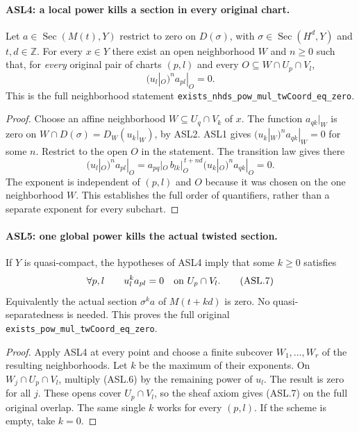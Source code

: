\paragraph{ASL4: a local power kills a section in every original chart.}
\label{claim:ASL4}
Let $a\in\operatorname{Sec}(M(t),Y)$ restrict to zero on
$D(\sigma)$, with $\sigma\in\operatorname{Sec}(H^d,Y)$ and
$t,d\in\mathbb Z$.  For every $x\in Y$ there exist an open
neighborhood $W$ and $n\ge0$ such that, for \emph{every} original
pair of charts $(p,l)$ and every
$O\subseteq W\cap U_p\cap V_l$,
\[
                    (u_l|_O)^n a_{pl}|_O=0.          \tag{ASL.6}
\]
This is the full neighborhood statement
\texttt{exists\_\allowbreak{}nhds\_\allowbreak{}pow\_\allowbreak{}mul\_\allowbreak{}tw\allowbreak{}Coord\_\allowbreak{}eq\_\allowbreak{}zero}.

\begin{proof}
Choose an affine neighborhood $W\subseteq U_q\cap V_k$ of $x$.
The function $a_{qk}|_W$ is zero on
$W\cap D(\sigma)=D_W(u_k|_W)$, by ASL2.  ASL1 gives
$(u_k|_W)^n a_{qk}|_W=0$ for some $n$.
Restrict to the open $O$ in the statement.  The transition law gives there
\[
 (u_l|_O)^n a_{pl}|_O
   =a_{pq}|_O\, b_{lk}|_O^{\,t+nd}
                           (u_k|_O)^n a_{qk}|_O=0.
\]
The exponent is independent of $(p,l)$ and $O$ because it was
chosen on the one neighborhood $W$.  This establishes the full
order of quantifiers, rather than a separate exponent for every
subchart.
\end{proof}

\paragraph{ASL5: one global power kills the actual twisted section.}
\label{claim:ASL5}
If $Y$ is quasi-compact, the hypotheses of ASL4 imply that some
$k\ge0$ satisfies
\[
 \forall p,l\qquad u_l^k a_{pl}=0
                 \quad\hbox{on }U_p\cap V_l.         \tag{ASL.7}
\]
Equivalently the actual section $\sigma^k a$ of $M(t+kd)$ is
zero.  No quasi-separatedness is needed.  This proves the full
original \texttt{exists\_\allowbreak{}pow\_\allowbreak{}mul\_\allowbreak{}tw\allowbreak{}Coord\_\allowbreak{}eq\_\allowbreak{}zero}.

\begin{proof}
Apply ASL4 at every point and choose a finite subcover
$W_1,\ldots,W_r$ of the resulting neighborhoods.  Let $k$ be
the maximum of their exponents.  On
$W_j\cap U_p\cap V_l$, multiply (ASL.6) by the remaining
power of $u_l$.  The result is zero for all $j$.
These opens cover $U_p\cap V_l$, so the sheaf axiom gives
(ASL.7) on the full original overlap.  The same single $k$
works for every $(p,l)$.  If the scheme is empty, take $k=0$.
\end{proof}

